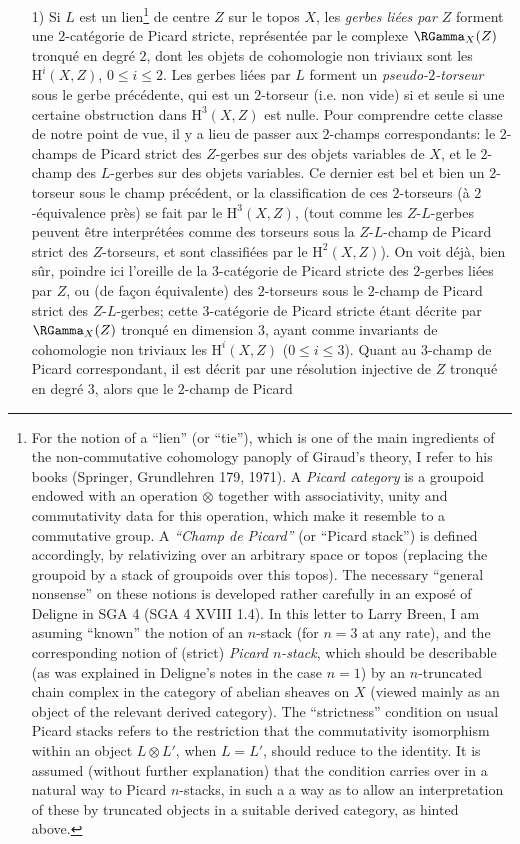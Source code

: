\begin{enumerate}
 \item[1)]\label{it:app1.1} Si $L$ est un lien\footnote{For the notion of a ``lien'' (or ``tie''), which is one of the main ingredients of the non-commutative cohomology panoply of Giraud's theory, I refer to his books (Springer, Grundlehren 179, 1971). A \emph{Picard category} is a groupoid endowed with an operation $\otimes$ together with associativity, unity and commutativity data for this operation, which make it resemble to a commutative group. A \emph{``Champ de Picard''} (or ``Picard stack'') is defined accordingly, by relativizing over an arbitrary space or topos (replacing the groupoid by a stack of groupoids over this topos). The necessary ``general nonsense'' on these notions is developed rather carefully in an exposé of Deligne in SGA 4 (SGA 4 XVIII 1.4). In this letter to Larry Breen, I am asuming ``known'' the notion of an $n$-stack (for $n = 3$ at any rate), and the corresponding notion of (strict) \emph{Picard $n$-stack}, which should be describable (as was explained in Deligne's notes in the case $n = 1$) by an $n$-truncated chain complex in the category of abelian sheaves on $X$ (viewed mainly as an object of the relevant derived category). The ``strictness'' condition on usual Picard stacks refers to the restriction that the commutativity isomorphism within an object $L \otimes L'$, when $L = L'$, should reduce to the identity. It is assumed (without further explanation) that the condition carries over in a natural way to Picard $n$-stacks, in such a a way as to allow an interpretation of these by truncated objects in a suitable derived category, as hinted above.} de centre $Z$ sur le topos $X$, les \emph{gerbes liées par $Z$} forment une $2$-catégorie de Picard stricte, représentée par le complexe $\RGamma_X(Z)$ tronqué en degré $2$, dont les objets de cohomologie non triviaux sont les $\mathrm H^i(X, Z)$, $0 \leq i \leq 2$. Les gerbes liées par $L$ forment un \emph{pseudo-$2$-torseur} sous le gerbe précédente, qui est un $2$-torseur (i.e. non vide) si et seule si une certaine obstruction dans $\mathrm H^3(X, Z)$ est nulle. Pour comprendre cette classe de notre point de vue, il y a lieu de passer aux $2$-champs correspondants: le $2$-champs de Picard strict des $Z$-gerbes sur des objets variables de $X$, et le $2$-champ des $L$-gerbes sur des objets variables. Ce dernier est bel et bien un $2$-torseur sous le champ précédent, or la classification de ces $2$-torseurs (à $2$-équivalence près) se fait par le $\mathrm H^3(X, Z)$, (tout comme les $Z$-$L$-gerbes peuvent être interprétées comme des torseurs sous la $Z$-$L$-champ de Picard strict des $Z$-torseurs, et sont classifiées  par le $\mathrm H^2(X, Z)$). On voit déjà, bien sûr, poindre ici l'oreille de la $3$-catégorie de Picard stricte des $2$-gerbes liées par $Z$, ou (de fa\c{c}on équivalente) des $2$-torseurs sous le $2$-champ de Picard strict des $Z$-$L$-gerbes; cette $3$-catégorie de Picard stricte étant décrite par $\RGamma_X(Z)$ tronqué en dimension $3$, ayant comme invariants de cohomologie non triviaux les $\mathrm H^i(X, Z)$ ($0 \leq i \leq 3$). Quant au $3$-champ de Picard correspondant, il est décrit par une résolution injective de $Z$ tronqué en degré $3$, alors que le $2$-champ de Picard 
\end{enumerate}
